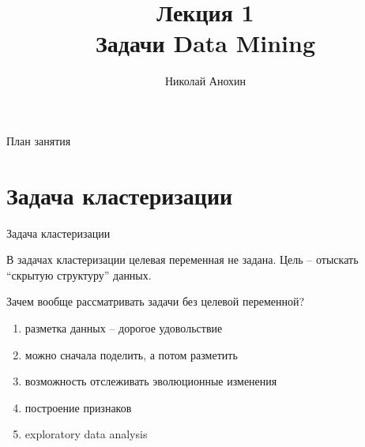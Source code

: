 \documentclass[10pt]{beamer}
\author{Николай Анохин}
\title{\newline \newline \newline Лекция 1 \\ Задачи Data Mining}
\let\otp\titlepage
\renewcommand{\titlepage}{\otp\addtocounter{framenumber}{-1}}
\begin{document}

\begin{frame}[plain]
\titlepage
\end{frame}

\begin{frame}{План занятия}
\tableofcontents
\end{frame}

\section{Задача кластеризации}

\begin{frame}{Задача кластеризации}

В задачах кластеризации целевая переменная не задана. Цель -- отыскать ``скрытую структуру'' данных.

\vspace{1em}
Зачем вообще рассматривать задачи без целевой переменной?
\begin{enumerate}
\item разметка данных -- дорогое удовольствие
\item можно сначала поделить, а потом разметить
\item возможность отслеживать эволюционные изменения
\item построение признаков
\item exploratory data analysis
\end{enumerate}

\end{frame}
\end{document}
